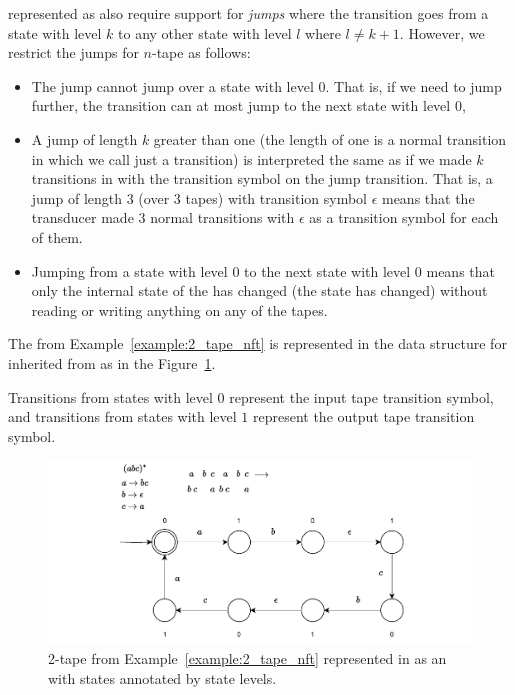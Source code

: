 \nfts represented as \nfaClass also require support for \emph{jumps} where the transition goes from a state with level $k$ to any other state with level $l$ where $l \neq k + 1$.
However, we restrict the jumps for $n$-tape \nft as follows:
\begin{itemize}
  \item The jump cannot jump over a state with level $0$.
  That is, if we need to jump further, the transition can at most jump to the next state with level $0$,
  \item A jump of length $k$ greater than one (the length of one is a normal transition in \nfaClass which we call just a transition) is interpreted the same as if we made $k$ transitions in \nfaClass with the transition symbol on the jump transition.
  That is, a jump of length $3$ (over $3$ tapes) with transition symbol $\epsilon$ means that the transducer made $3$ normal transitions with $\epsilon$ as a transition symbol for each of them.
  \item Jumping from a state with level $0$ to the next state with level $0$ means that only the internal state of the \nft has changed (the state has changed) without reading or writing anything on any of the tapes.
\end{itemize}





\begin{example}\label{example:2_tape_nft_in_mata}
  The \nft from Example~\ref{example:2_tape_nft} is represented in the data structure for \nfts inherited from \nfaClass as in the Figure~\ref{fig:2_tape_nft_in_mata}.

  Transitions from states with level $0$ represent the input tape transition symbol, and transitions from states with level $1$ represent the output tape transition symbol.

  \begin{figure}[ht]
    \centering
    \includegraphics[scale=1.0,keepaspectratio]{obrazky-figures/transducer_in_mata.drawio.pdf}
    \caption{
      2-tape \nft from Example~\ref{example:2_tape_nft} represented in \mata as an \nfaClass with states annotated by state levels.
    }\label{fig:2_tape_nft_in_mata}
  \end{figure}
\end{example}

